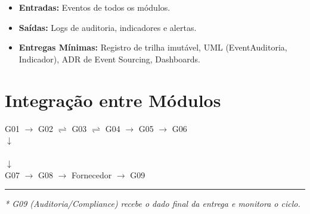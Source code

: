 \documentclass[a4paper,12pt]{article}
\begin{document}
\begin{itemize}[leftmargin=*]
    \item \textbf{Entradas:} Eventos de todos os módulos.
    \item \textbf{Saídas:} Logs de auditoria, indicadores e alertas.
    \item \textbf{Entregas Mínimas:} Registro de trilha imutável, UML (EventAuditoria, Indicador), ADR de Event Sourcing, Dashboards.
\end{itemize}

\section*{Integração entre Módulos}

\begin{tcolorbox}[colback=blue!5, colframe=blue!75!black, title=Fluxo de Dados Sequencial]
\centering
\small
G01 $\to$ G02 $\rightleftharpoons$ G03 $\rightleftharpoons$ G04 $\to$ G05 $\to$ G06 \\
\vspace{2mm}
$\downarrow$ \\
 \\
$\downarrow$ \\
G07 $\to$ G08 $\to$ Fornecedor $\to$ G09 \\
\vspace{3mm}
\hrule
\vspace{2mm}
\textit{* G09 (Auditoria/Compliance) recebe o dado final da entrega e monitora o ciclo.}
\end{tcolorbox}
\end{document}
